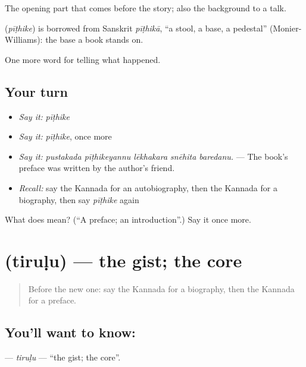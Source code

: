 The opening part that comes before the story; also the background to a talk.

\begin{cousinweb}
\textbf{} (\emph{pīṭhike}) is borrowed from Sanskrit \emph{pīṭhikā}, \textquotedblleft{}a stool, a base, a pedestal\textquotedblright{} (Monier-Williams): the base a book stands on.
\end{cousinweb}

\begin{grammarlens}[title={What you've built}]
One more word for telling what happened.
\end{grammarlens}

\subsection*{Your turn}
\begin{itemize}
\raggedright
  \item \emph{Say it:} \emph{pīṭhike}
  \item \emph{Say it:} \emph{pīṭhike}, once more
  \item \emph{Say it:} \emph{pustakada pīṭhikeyannu lēkhakara snēhita baredanu.} — The book's preface was written by the author's friend.
  \item \emph{Recall:} say the Kannada for an autobiography, then the Kannada for a biography, then say \emph{pīṭhike} again
\end{itemize}

\begin{tcolorbox}[breakable,colback=teal!4,colframe=teal!35!black,title={Before you move on}]
What does  mean? (\textquotedblleft{}A preface; an introduction\textquotedblright{}.) Say it once more.
\end{tcolorbox}
\section[\texorpdfstring{\kn{ತಿರುಳು} (tiruḷu)}{ತಿರುಳು (tiruḷu)}]{ (tiruḷu) — the gist; the core}

\label{lesson:KA-C364-tirulu}



\begin{quote}
Before the new one: say the Kannada for a biography, then the Kannada for a preface.
\end{quote}

\subsection*{You'll want to know: }
\textbf{} — \emph{tiruḷu} — \textquotedblleft{}the gist; the core\textquotedblright{}.

